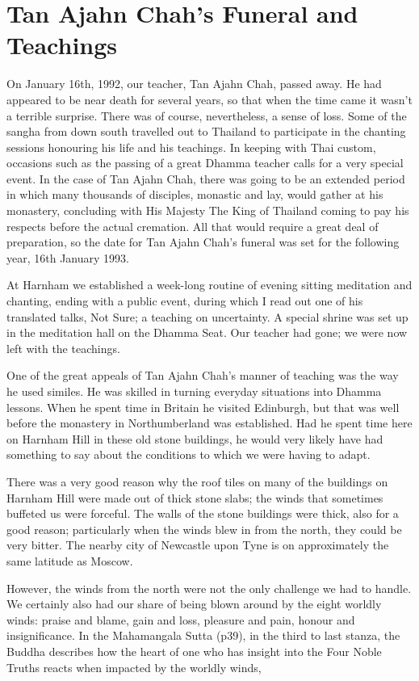 \chapter{Tan Ajahn Chah's Funeral and Teachings}

On January 16th, 1992, our teacher, Tan Ajahn Chah, passed away. He had
appeared to be near death for several years, so that when the time came
it wasn't a terrible surprise. There was of course, nevertheless, a
sense of loss. Some of the sangha from down south travelled out to
Thailand to participate in the chanting sessions honouring his life and
his teachings. In keeping with Thai custom, occasions such as the
passing of a great Dhamma teacher calls for a very special event. In the
case of Tan Ajahn Chah, there was going to be an extended period in
which many thousands of disciples, monastic and lay, would gather at his
monastery, concluding with His Majesty The King of Thailand coming to
pay his respects before the actual cremation. All that would require a
great deal of preparation, so the date for Tan Ajahn Chah's funeral was
set for the following year, 16th January 1993.

At Harnham we established a week-long routine of evening sitting
meditation and chanting, ending with a public event, during which I read
out one of his translated talks, Not Sure\cite{collected}; a teaching on
uncertainty. A special shrine was set up
in the meditation hall on the Dhamma Seat. Our teacher had gone; we were
now left with the teachings.

One of the great appeals of Tan Ajahn Chah's manner of teaching was the
way he used similes. He was skilled in turning everyday situations into
Dhamma lessons. When he spent time in Britain he visited Edinburgh, but
that was well before the monastery in Northumberland was established.
Had he spent time here on Harnham Hill in these old stone buildings, he
would very likely have had something to say about the conditions to
which we were having to adapt.

There was a very good reason why the roof tiles on many of the buildings
on Harnham Hill were made out of thick stone slabs; the winds that
sometimes buffeted us were forceful. The walls of the stone buildings
were thick, also for a good reason; particularly when the winds blew in
from the north, they could be very bitter. The nearby city of Newcastle
upon Tyne is on approximately the same latitude as Moscow.

However, the winds from the north were not the only challenge we had to
handle. We certainly also had our share of being blown around by the
eight worldly winds: praise and blame, gain and loss, pleasure and pain,
honour and insignificance. In the Mahamangala Sutta\cite{mahamangala}
(p39), in the third to last stanza, the Buddha
describes how the heart of one who has insight into the Four Noble
Truths reacts when impacted by the worldly winds,

